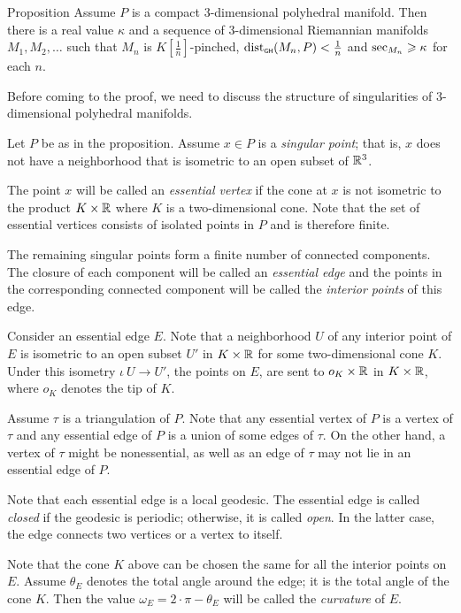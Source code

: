 \documentclass[a4paper,10pt]{amsart}
\begin{document}
\begin{thm}{Proposition}\label{prop:smooth}
Assume $P$ is a compact 3-dimensional polyhedral manifold.
Then there is a real value $\kappa$ and a sequence of 3-dimensional Riemannian manifolds $M_1, M_2,\dots$ 
such that  $M_n$ is $K[\tfrac1n]$-pinched,  $\operatorname{dist}_{\text{\sf\tiny GH}}(M_n,P)<\tfrac1n$ and $\mathrm{sec}_{M_n}\geqslant \kappa$ for each $n$.
\end{thm}
 

Before coming to the proof, we need to discuss the structure of singularities of $3$-dimensional polyhedral manifolds.

Let $P$ be as in the proposition.
Assume $x\in P$ is a \emph{singular point};
that is, $x$ does not have a neighborhood that is isometric to an open subset of $\mathbb{R}^3$.

The point $x$  will be called an \emph{essential vertex} if the cone at $x$ 
is not isometric to the product $K\times \mathbb{R}$ where $K$ is a two-dimensional cone.
Note that the set of essential vertices consists of isolated points in $P$ and is therefore finite.

The remaining singular points form a finite number of connected components.
The closure of each component will be called an \emph{essential edge}
and the points in the corresponding connected component
will be called the \emph{interior points} of this edge.

Consider an essential edge $E$.
Note that a neighborhood $U$ of any interior point of $E$ is isometric to an open subset $U'$ in $K\times \mathbb{R}$ for some two-dimensional cone $K$.
Under this isometry $\iota\: U\to U'$,
the points on $E$,
are sent to $o_K\times \mathbb{R}$ in $K\times \mathbb{R}$,
where $o_K$ denotes the tip of $K$.

Assume $\tau$ is a triangulation of $P$.
Note that any essential vertex of $P$ is a vertex of $\tau$
and any essential edge of $P$ is a union of some edges of $\tau$.
On the other hand, a vertex of $\tau$ might be nonessential,
as well as an edge of $\tau$ may not lie in an essential edge of $P$.

Note that each essential edge is a local geodesic.
The essential edge is called \emph{closed} if the geodesic is periodic;
otherwise, it is called \emph{open}. 
In the latter case, the edge connects two vertices 
or a vertex to itself.

Note that the cone $K$ above can be chosen 
the same for all the interior points on $E$.
Assume $\theta_E$ denotes the total angle around the edge;
it is the total angle of the cone $K$.
Then the value $\omega_E=2\cdot\pi-\theta_E$ will be called the \emph{curvature} of $E$. 
\end{document}
